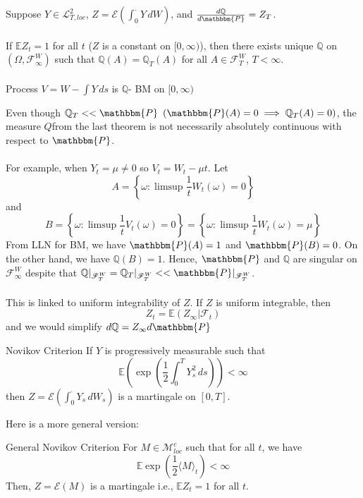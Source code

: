 \documentclass[12pt,a4paper]{article}
\newcommand{\Q}{\mathbb{Q}}
\newcommand{\E}{\mathbb{E}}
\begin{document}
    \begin{theorem}{}{}
        Suppose $Y\in\mathcal{L}^2_{T,loc}$, $Z = \mathcal{E}(\int_0^\cdot Y\, dW)$, and $\frac{d\Q}{d\mathbbm{P}} = Z_T$. \\
        \\
        If $\E Z_t = 1$ for all $t$  ($Z$ is a constant on $[0,\infty)$), then there exists unique $\Q$ on $(\Omega,\mathscr{F}_\infty^W)$ such that $\Q(A) = \Q_T(A)$ for all $A\in\mathscr{F}_T^W$, $T<\infty$.\\
        \\
        Process $V = W-\int Y\,ds$ is $\Q$- BM on $[0,\infty)$
    \end{theorem}
    \begin{remark}{}{}
        Even though $\Q_T<<\mathbbm{P}$ $(\mathbbm{P}(A) = 0 \implies \Q_T(A)=0)$, the measure $Q$from the last theorem is not necessarily absolutely continuous with respect to $\mathbbm{P}$.\\
        \\
        For example, when $Y_t = \mu\neq 0$ so $V_t = W_t -\mu t$. Let 
        $$
        A = \left\{\omega: \limsup \frac{1}{t}W_t(\omega) = 0\right\}
        $$
        and
        $$
        B = \left\{\omega: \limsup \frac{1}{t}V_t(\omega) = 0\right\} = \left\{\omega: \limsup \frac{1}{t}W_t(\omega) = \mu\right\}
        $$
        From LLN for BM, we have $\mathbbm{P}(A) = 1$ and $\mathbbm{P}(B)=0$. On the other hand, we have $\Q(B)=1$. Hence, $\mathbbm{P}$ and $\Q$ are singular on $\mathscr{F}_\infty^W$ despite that $\Q|_{\mathscr{F}_T^W} = \Q_T|_{\mathscr{F}_T^W}<<\mathbbm{P}|_{\mathscr{F}_T^W}$.\\
        \\
        This is linked to uniform integrability of $Z$. If $Z$ is uniform integrable, then 
        $$
        Z_t = \E(Z_\infty|\mathscr{F}_t)
        $$
        and we would simplify $d\Q = Z_\infty d\mathbbm{P}$
    \end{remark}
    \pagebreak
    \begin{theorem}{Novikov Criterion}{}
        If $Y$ is progressively measurable such that 
        $$
        \E\left(\exp\left(\frac{1}{2}\int_0^T Y_s^2\, ds\right)\right)<\infty
        $$
        then $Z = \mathcal{E}(\int_0^\cdot Y_s\, dW_s)$ is a martingale on $[0,T]$.
    \end{theorem}
    Here is a more general version:
    \begin{theorem}{General Novikov Criterion}{}
        For $M\in\mathcal{M}^c_{loc}$ such that for all $t$, we have
        $$
        \E\exp\left(\frac{1}{2}\langle M\rangle_t\right)<\infty
        $$
        Then, $Z= \mathcal{E}(M)$ is a martingale i.e., $\E Z_t=1$ for all $t$.
    \end{theorem}
\end{document}
